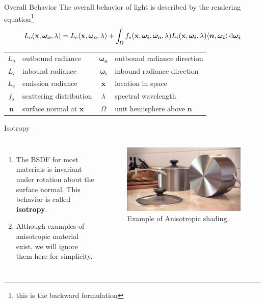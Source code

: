 \documentclass[10pt]{beamer}
\DeclarePairedDelimiter\ip{\langle }{\rangle}
\begin{document}
\begin{frame}{Overall Behavior}
  The overall behavior of light is described by the rendering equation\footnote{this is the backward formulation}
  \[L_{o}(\mathbf x, \bm {\omega_{o}}, \lambda) = L_{e}(\mathbf x, \bm{\omega_o}, \lambda) + \int_\Omega f_s(\mathbf x, \bm{\omega_i}, \bm{\omega_o}, \lambda)L_i(\mathbf x, \bm{\omega_i}, \lambda)\ip{\bm n, \bm{\omega_i}} \dif \bm{\omega_i}\]

  \hrulefill

  \begin{center}
    \begin{tabu}{clcl}
      \(L_{o}\)& outbound radiance & \(\bm{\omega_o}\)& outbound radiance direction\\
      \(L_{i}\)& inbound radiance & \(\bm{\omega_i}\) &inbound radiance direction\\
      \(L_{e}\)& emission radiance & \(\mathbf x\) &location in space\\
      \(f_s\) & scattering distribution & \(\lambda\)& spectral wavelength\\
      \(\bm n\)& surface normal at \(\mathbf x\) & \(\Omega\) & unit hemisphere above \(\bm n\)
    \end{tabu}
  \end{center}
\end{frame}

\begin{frame}{Isotropy}
  \begin{columns}
    \begin{enumerate}
    \item The BSDF for most materials is invariant under rotation about the surface normal.
      This behavior is called \textbf{isotropy}.

    \item Although examples of anisotropic material exist, we will ignore them here for simplicity.
    \end{enumerate}

    \begin{figure}[H]
      \centering
      \includegraphics[width=\linewidth,keepaspectratio]{anisotropy.jpg}
      \caption{Example of Anisotropic shading.}
    \end{figure}
  \end{columns}
\end{frame}
\end{document}
